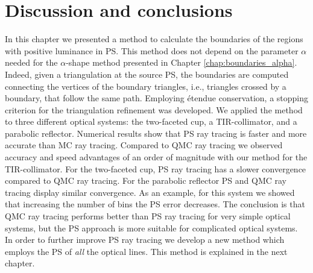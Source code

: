 \section{Discussion and conclusions}
In this chapter we presented a method to calculate the boundaries of the regions with positive luminance in PS. This method does not depend on the parameter $\alpha$ needed for the $\alpha$-shape method presented in Chapter \ref{chap:boundaries_alpha}. Indeed, given a triangulation at the source PS, the boundaries are computed connecting the vertices of the boundary triangles, i.e., triangles crossed by a boundary, that follow the same path. Employing \'{e}tendue conservation, a stopping criterion for the triangulation refinement was developed. We applied the method to three different optical systems: the two-faceted cup, a TIR-collimator, and a parabolic reflector. Numerical results show that PS ray tracing is faster and more accurate than MC ray tracing. Compared to QMC ray tracing we observed accuracy and speed advantages of an order of magnitude with our method for the TIR-collimator. 
For the two-faceted cup, PS ray tracing has a slower convergence compared to QMC ray tracing. For the parabolic reflector PS and QMC ray tracing display similar convergence. As an example, for this system we showed that increasing the number of bins the PS error decreases. 
The conclusion is that QMC ray tracing performs better than PS ray tracing for very simple optical systems, but the PS approach is more suitable for complicated optical systems.
\\ \indent In order to further improve PS ray tracing we develop a new method which employs the PS of \textit{all} the optical lines. This method is explained in the next chapter.









 

